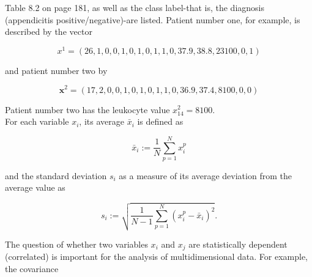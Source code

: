 \documentclass[10pt]{book}
\begin{document}
Table 8.2 on page 181, as well as the class label-that is, the diagnosis (appendicitis positive/negative)-are listed. Patient number one, for example, is described by the vector

$$
x^{1}=(26,1,0,0,1,0,1,0,1,1,0,37.9,38.8,23100,0,1)
$$

and patient number two by

$$
\boldsymbol{x}^{2}=(17,2,0,0,1,0,1,0,1,1,0,36.9,37.4,8100,0,0)
$$

Patient number two has the leukocyte value $x_{14}^{2}=8100$.\\
For each variable $x_{i}$, its average $\bar{x}_{i}$ is defined as

$$
\bar{x}_{i}:=\frac{1}{N} \sum_{p=1}^{N} x_{i}^{p}
$$

and the standard deviation $s_{i}$ as a measure of its average deviation from the average value as

$$
s_{i}:=\sqrt{\frac{1}{N-1} \sum_{p=1}^{N}\left(x_{i}^{p}-\bar{x}_{i}\right)^{2}} .
$$

The question of whether two variables $x_{i}$ and $x_{j}$ are statistically dependent (correlated) is important for the analysis of multidimensional data. For example, the covariance
\end{document}
